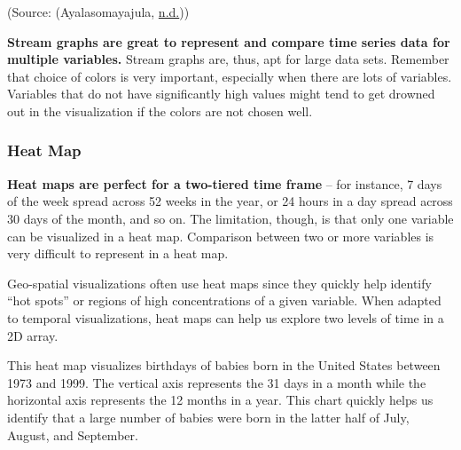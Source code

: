 \documentclass[]{book}
\begin{document}
(Source: (Ayalasomayajula, \protect\hyperlink{ref-aya-time-series}{n.d.}))

\textbf{Stream graphs are great to represent and compare time series data for multiple variables.} Stream graphs are, thus, apt for large data sets. Remember that choice of colors is very important, especially when there are lots of variables. Variables that do not have significantly high values might tend to get drowned out in the visualization if the colors are not chosen well.

\hypertarget{heat-map}{%
\subsubsection{Heat Map}\label{heat-map}}

\textbf{Heat maps are perfect for a two-tiered time frame} -- for instance, 7 days of the week spread across 52 weeks in the year, or 24 hours in a day spread across 30 days of the month, and so on. The limitation, though, is that only one variable can be visualized in a heat map. Comparison between two or more variables is very difficult to represent in a heat map.

Geo-spatial visualizations often use heat maps since they quickly help identify ``hot spots'' or regions of high concentrations of a given variable. When adapted to temporal visualizations, heat maps can help us explore two levels of time in a 2D array.

This heat map visualizes birthdays of babies born in the United States between 1973 and 1999. The vertical axis represents the 31 days in a month while the horizontal axis represents the 12 months in a year. This chart quickly helps us identify that a large number of babies were born in the latter half of July, August, and September.
\end{document}
